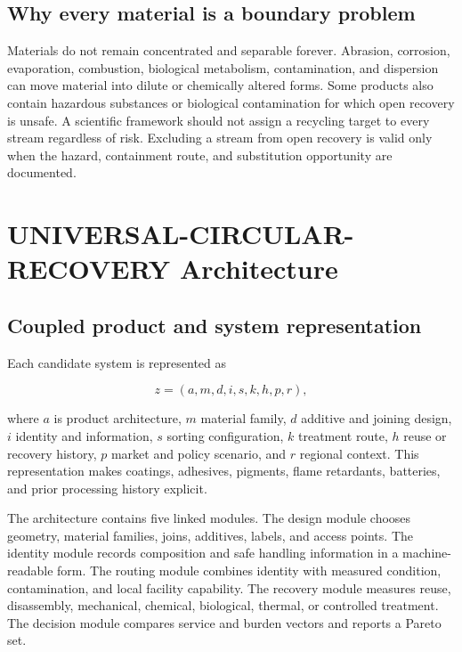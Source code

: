 \documentclass[conference]{IEEEtran}
\begin{document}
\subsection{Why every material is a boundary problem}

Materials do not remain concentrated and separable forever. Abrasion, corrosion, evaporation, combustion, biological metabolism, contamination, and dispersion can move material into dilute or chemically altered forms. Some products also contain hazardous substances or biological contamination for which open recovery is unsafe. A scientific framework should not assign a recycling target to every stream regardless of risk. Excluding a stream from open recovery is valid only when the hazard, containment route, and substitution opportunity are documented.

\section{UNIVERSAL-CIRCULAR-RECOVERY Architecture}

\subsection{Coupled product and system representation}

Each candidate system is represented as

\begin{equation}
z=(a,m,d,i,s,k,h,p,r),
\label{eq:candidate}
\end{equation}

where $a$ is product architecture, $m$ material family, $d$ additive and joining design, $i$ identity and information, $s$ sorting configuration, $k$ treatment route, $h$ reuse or recovery history, $p$ market and policy scenario, and $r$ regional context. This representation makes coatings, adhesives, pigments, flame retardants, batteries, and prior processing history explicit.

The architecture contains five linked modules. The design module chooses geometry, material families, joins, additives, labels, and access points. The identity module records composition and safe handling information in a machine-readable form. The routing module combines identity with measured condition, contamination, and local facility capability. The recovery module measures reuse, disassembly, mechanical, chemical, biological, thermal, or controlled treatment. The decision module compares service and burden vectors and reports a Pareto set.
\end{document}
